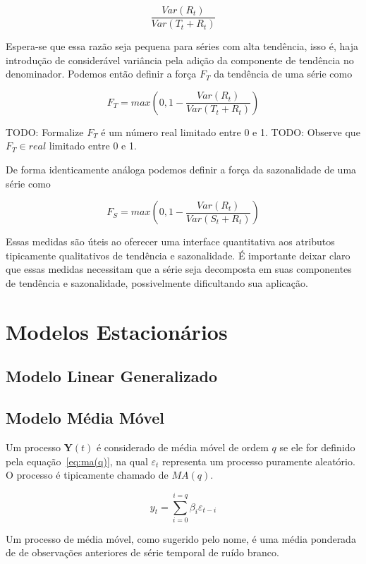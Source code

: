 $$ \frac{Var(R_t)}{Var(T_t + R_t)} $$

Espera-se que essa razão seja pequena para séries com alta tendência, isso é,
haja introdução de considerável variância pela adição da componente de
tendência no denominador. Podemos então definir a força $F_T$ da tendência de
uma série como

$$ F_T = max\left(0, 1 - \frac{Var(R_t)}{Var(T_t + R_t)}\right) $$

TODO: Formalize $F_T$ é um número real limitado entre 0 e 1.
TODO: Observe que $F_T \in real$ limitado entre 0 e 1.

De forma identicamente análoga podemos definir a força da sazonalidade de uma
série como

$$ F_S = max\left(0, 1 - \frac{Var(R_t)}{Var(S_t + R_t)}\right) $$

Essas medidas são úteis ao oferecer uma interface quantitativa aos atributos
tipicamente qualitativos de tendência e sazonalidade. É importante deixar
claro que essas medidas necessitam que a série seja decomposta em suas
componentes de tendência e sazonalidade, possivelmente dificultando sua
aplicação.

\section{Modelos Estacionários}

\subsection{Modelo Linear Generalizado}
\label{sec:glm}

\subsection{Modelo Média Móvel}
\label{ssec:MA(p)}

Um processo $\mathbf{Y}(t)$ é considerado de média móvel de ordem $q$ se ele
for definido pela equação~\ref{eq:ma(q)}, na qual $\varepsilon_t$ representa um
processo puramente aleatório. O processo é tipicamente chamado de $MA(q)$.

\begin{equation}\label{eq:ma(q)}
    y_t = \sum_{i=0}^{i=q} \beta_i \varepsilon_{t-i}
\end{equation}

Um processo de média móvel, como sugerido pelo nome, é uma média ponderada de
de observações anteriores de série temporal de ruído branco.

